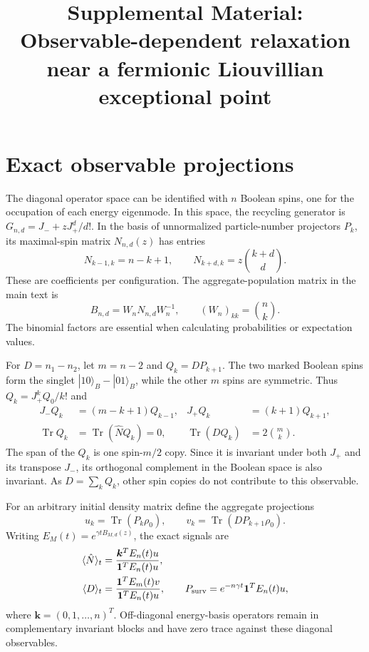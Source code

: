 \documentclass[aps,pra,reprint,superscriptaddress,nofootinbib,floatfix]{revtex4-2}
\newcommand{\Tr}{\operatorname{Tr}}
\begin{document}
\title{Supplemental Material: Observable-dependent relaxation near a fermionic Liouvillian exceptional point}
\maketitle

\section{Exact observable projections}
The diagonal operator space can be identified with $n$ Boolean spins, one for the occupation of each energy eigenmode. In this space, the recycling generator is $G_{n,d}=J_-+zJ_+^d/d!$. In the basis of unnormalized particle-number projectors $P_k$, its maximal-spin matrix $N_{n,d}(z)$ has entries
\begin{equation}
N_{k-1,k}=n-k+1,\qquad N_{k+d,k}=z\binom{k+d}{d}.
\label{eq:N}
\end{equation}
These are coefficients per configuration. The aggregate-population matrix in the main text is
\begin{equation}
B_{n,d}=W_nN_{n,d}W_n^{-1},\qquad
(W_n)_{kk}=\binom nk.
\label{eq:weight}
\end{equation}
The binomial factors are essential when calculating probabilities or expectation values.

For $D=n_1-n_2$, let $m=n-2$ and $Q_k=DP_{k+1}$. The two marked Boolean spins form the singlet $|10\rangle_B-|01\rangle_B$, while the other $m$ spins are symmetric. Thus $Q_k=J_+^kQ_0/k!$ and
\begin{align}
J_-Q_k&=(m-k+1)Q_{k-1},& J_+Q_k&=(k+1)Q_{k+1},\nonumber\\
\Tr Q_k&=\Tr(\hat NQ_k)=0,& \Tr(DQ_k)&=2\binom mk.
\label{eq:identities}
\end{align}
The span of the $Q_k$ is one spin-$m/2$ copy. Since it is invariant under both $J_+$ and its transpose $J_-$, its orthogonal complement in the Boolean space is also invariant. As $D=\sum_kQ_k$, other spin copies do not contribute to this observable.

For an arbitrary initial density matrix define the aggregate projections
\begin{equation}
u_k=\Tr(P_k\rho_0),\qquad v_k=\Tr(DP_{k+1}\rho_0).
\end{equation}
Writing $E_M(t)=e^{\gamma t B_{M,d}(z)}$, the exact signals are
\begin{align}
\langle\hat N\rangle_t&=\frac{\bm k^TE_n(t)u}{\bm1^TE_n(t)u},\nonumber\\
\langle D\rangle_t&=\frac{\bm1^TE_m(t)v}{\bm1^TE_n(t)u},\qquad
P_{\rm surv}=e^{-n\gamma t}\bm1^TE_n(t)u,
\label{eq:general}
\end{align}
where $\bm k=(0,1,\ldots,n)^T$. Off-diagonal energy-basis operators remain in complementary invariant blocks and have zero trace against these diagonal observables.
\end{document}
